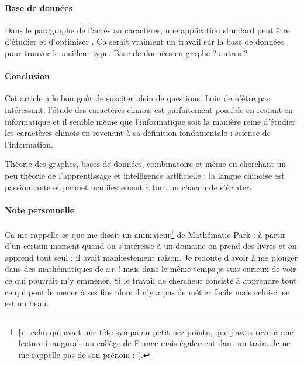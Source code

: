 \paragraph{Base de données} Dans le paragraphe de l'accès au caractères, une application standard peut être d'étudier et d'optimiser . Ca serait vraiment un travail sur la base de données pour trouver le meilleur type. Base de données en graphe ? autres ?

\paragraph{Conclusion} Cet article a le bon goût de susciter plein de questions. Loin de n'être pas intéressant, l'étude des caractères chinois est parfaitement possible en restant en informatique et il semble même que l'informatique soit la manière reine d'étudier les caractères chinois en revenant à sa définition fondamentale : science de l'information.\par Théorie des graphes, bases de données, combinatoire et même en cherchant un peu théorie de l'apprentissage et intelligence artificielle : la langue chinoise est passionnante et permet manifestement à tout un chacun de s'éclater.

\paragraph{Note personnelle} Ca me rappelle ce que me disait un animateur\footnote{þ : celui qui avait une tête sympa au petit nez pointu, que j'avais revu à une lecture inaugurale au collège de France mais également dans un train. Je ne me rappelle pas de son prénom :-(.} de Mathématic Park : à partir d'un certain moment quand on s'intéresse à un domaine on prend des livres et on apprend tout seul ; il avait manifestement raison. Je redoute d'avoir à me plonger dans des mathématiques de \textsc{mp} ! mais dans le même temps je suis curieux de voir ce qui pourrait m'y emmener. Si le travail de chercheur consiste à apprendre tout ce qui peut le mener à ses fins alors il n'y a pas de métier facile mais celui-ci en est un beau.
